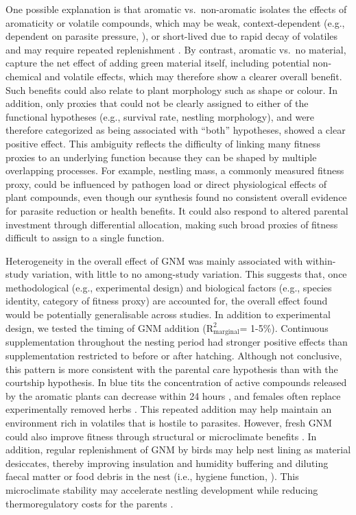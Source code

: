 \documentclass[
  number,
  review,
  onecolumn]{elsarticle}
\begin{document}
One possible explanation is that aromatic vs.~non-aromatic isolates the
effects of aromaticity or volatile compounds, which may be weak,
context-dependent (e.g., dependent on parasite pressure,
\citep{clark1985}), or short-lived due to rapid decay of volatiles
\citep{petit2002} and may require repeated replenishment
\citep{mennerat2008}. By contrast, aromatic vs.~no material, capture the
net effect of adding green material itself, including potential
non-chemical and volatile effects, which may therefore show a clearer
overall benefit. Such benefits could also relate to plant morphology
such as shape or colour. In addition, only proxies that could not be
clearly assigned to either of the functional hypotheses (e.g., survival
rate, nestling morphology), and were therefore categorized as being
associated with ``both'' hypotheses, showed a clear positive effect.
This ambiguity reflects the difficulty of linking many fitness proxies
to an underlying function because they can be shaped by multiple
overlapping processes. For example, nestling mass, a commonly measured
fitness proxy, could be influenced by pathogen load or direct
physiological effects of plant compounds, even though our synthesis
found no consistent overall evidence for parasite reduction or health
benefits. It could also respond to altered parental investment through
differential allocation, making such broad proxies of fitness difficult
to assign to a single function.

Heterogeneity in the overall effect of GNM was mainly associated with
within-study variation, with little to no among-study variation. This
suggests that, once methodological (e.g., experimental design) and
biological factors (e.g., species identity, category of fitness proxy)
are accounted for, the overall effect found would be potentially
generalisable across studies. In addition to experimental design, we
tested the timing of GNM addition (\(\mathrm{R}^2_{\mathrm{marginal}}\)=
1-5\%). Continuous supplementation throughout the nesting period had
stronger positive effects than supplementation restricted to before or
after hatching. Although not conclusive, this pattern is more consistent
with the parental care hypothesis than with the courtship hypothesis. In
blue tits the concentration of active compounds released by the aromatic
plants can decrease within 24 hours \citep{petit2002}, and females often
replace experimentally removed herbs \citep{banbura1995, mennerat2008}.
This repeated addition may help maintain an environment rich in
volatiles that is hostile to parasites. However, fresh GNM could also
improve fitness through structural or microclimate benefits
\citep{mertens1977, mainwaring2014}. In addition, regular replenishment
of GNM by birds may help nest lining as material desiccates, thereby
improving insulation and humidity buffering
\citep{taverner1933, mertens1977} and diluting faecal matter or food
debris in the nest (i.e., hygiene function,
\citep{peralta-sanchez2010}). This microclimate stability may accelerate
nestling development while reducing thermoregulatory costs for the
parents \citep{nilsson2017, perez2020}.
\end{document}
